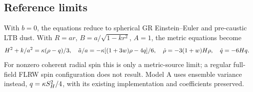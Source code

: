 \subsection{Reference limits}
With $b=0$, the equations reduce to spherical GR Einstein--Euler and pre-caustic LTB dust. With $R=ar$, $B=a/\sqrt{1-kr^2}$, $A=1$, the metric equations become
\begin{equation}
 H^2+k/a^2=\kappa(\rho-q)/3,\quad
 \ddot a/a=-\kappa[(1+3w)\rho-4q]/6,\quad
 \dot\rho=-3(1+w)H\rho,\quad\dot q=-6Hq.
\end{equation}
For nonzero coherent radial spin this is only a metric-source limit; a regular full-field FLRW spin configuration does not result. Model A uses ensemble variance instead, $q=\kappa S_H^2/4$, with its existing implementation and coefficients preserved.
